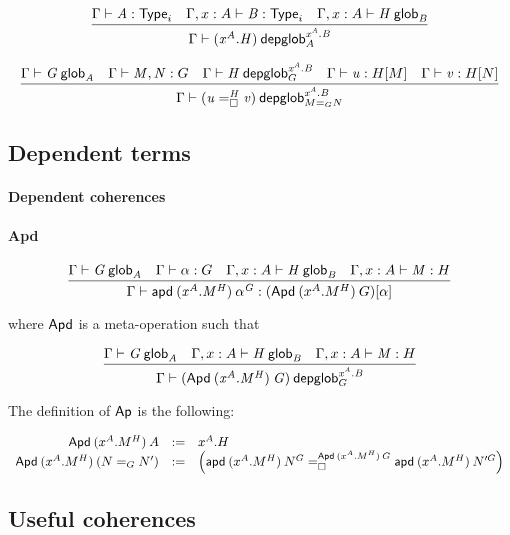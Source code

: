 \begin{small}
  \[\infer{\wfdepglob{\Gamma}{(x^A.H)}{0,m}{x^A.B}{A}}
  {\wftype{\Gamma}{A}
    & \wftype{\Gamma,x:A}{B}
    & \wfglob{\Gamma,x:A}{H}{m}{B}
  }\]

  \[\infer{\wfdepglob{\Gamma}{(\dhomj{H}{u}{v}{\blank})}{n+1,m}
    {x^A.B}{\homj{G}{M}{N}}} {\wfglob{\Gamma}{G}{n}{A} &
    \ofglob{\Gamma}{M,N}{G}
    & \wfdepglob{\Gamma}{H}{n,m}{x^A.B}{G} & \ofdepglob{\Gamma}{u}{H}{M} &
    \ofdepglob{\Gamma}{v}{H}{N} }\]
\end{small}

\subsection{Dependent terms}

\paragraph{Dependent coherences}



\paragraph{Apd}

\begin{small}
  \[\infer{\ofdepglob{\Gamma}{\apd{(x^A.M^H)}{\alpha^G}}
    {(\Apd{(x^A.M^H)}{G})}{\alpha}}
  {\wfglob{\Gamma}{G}{n}{A}
    & \ofglob{\Gamma}{\alpha}{G}
    & \wfglob{\Gamma,x:A}{H}{m}{B}
    & \ofglob{\Gamma,x:A}{M}{H}}\]

  where $\dsd{Apd}$ is a meta-operation such that

  \[\infer{\wfdepglob{\Gamma}{(\Apd{(x^A.M^H)}{G})}{n,m}
    {x^A.B}{G}}
  {\wfglob{\Gamma}{G}{n}{A}
    & \wfglob{\Gamma,x:A}{H}{m}{B}
    & \ofglob{\Gamma,x:A}{M}{H}}\]

  The definition of $\dsd{Ap}$ is the following:

  \[
  \begin{array}{rcl}
    \Apd{(x^A.M^H)}{A} & := & x^A.H \\
    \Apd{(x^A.M^H)}{(\homj{G}{N}{N'})} & := & \left(
      \dhomj{\Apd{(x^A.M^H)}{G}}
      {\apd{(x^A.M^H)}{N^G}}{\apd{(x^A.M^H)}{N'^G}}{\blank}\right)
  \end{array}
  \]
\end{small}


\subsection{Useful coherences}

